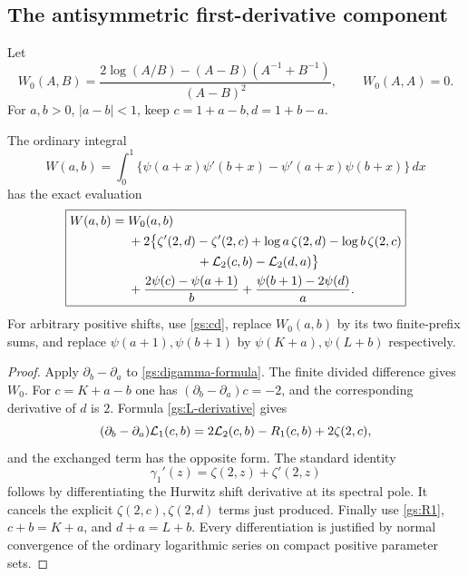 \subsection{The antisymmetric first-derivative component}

Let
\begin{equation}\label{gs:W0}
 W_0(A,B)=
 \frac{2\log(A/B)-(A-B)(A^{-1}+B^{-1})}{(A-B)^2},
 \qquad W_0(A,A)=0.
\end{equation}
For $a,b>0$, $|a-b|<1$, keep $c=1+a-b,d=1+b-a$.

\begin{theorem}
\label{gs:Wronskian}
The ordinary integral
\[
 W(a,b)=\int_0^1
 \{\psi(a+x)\psi'(b+x)-\psi'(a+x)\psi(b+x)\}\,dx
\]
has the exact evaluation
\begin{align}
 \boxed{\begin{aligned}
 W(a,b)={}&W_0(a,b)\\
 &+2\bigl\{\zeta'(2,d)-\zeta'(2,c)
       +\log a\,\zeta(2,d)-\log b\,\zeta(2,c)\\
 &\hspace{19mm}+\gsL_2(c,b)-\gsL_2(d,a)\bigr\}\\
 &+\frac{2\psi(c)-\psi(a+1)}b
       +\frac{\psi(b+1)-2\psi(d)}a.
 \end{aligned}}
 \label{gs:Wronskian-formula}
\end{align}
For arbitrary positive shifts, use \eqref{gs:cd}, replace $W_0(a,b)$
by its two finite-prefix sums, and replace $\psi(a+1),\psi(b+1)$
by $\psi(K+a),\psi(L+b)$ respectively.
\end{theorem}

\begin{proof}
Apply $\partial_b-\partial_a$ to \eqref{gs:digamma-formula}.
The finite divided difference gives $W_0$.
For $c=K+a-b$ one has
$(\partial_b-\partial_a)c=-2$, and the corresponding derivative
of $d$ is $2$.  Formula \eqref{gs:L-derivative} gives
\[
 (\partial_b-\partial_a)\mathcal L_1(c,b)
 =2\mathcal L_2(c,b)-R_1(c,b)+2\zeta(2,c),
\]
and the exchanged term has the opposite form.  The standard identity
\[
 \gamma_1'(z)=\zeta(2,z)+\zeta'(2,z)
\]
follows by differentiating the Hurwitz shift derivative at its spectral
pole.  It cancels the explicit $\zeta(2,c),\zeta(2,d)$ terms just
produced.  Finally use \eqref{gs:R1}, $c+b=K+a$, and $d+a=L+b$.
Every differentiation is justified by normal convergence of the
ordinary logarithmic series on compact positive parameter sets.
\end{proof}

